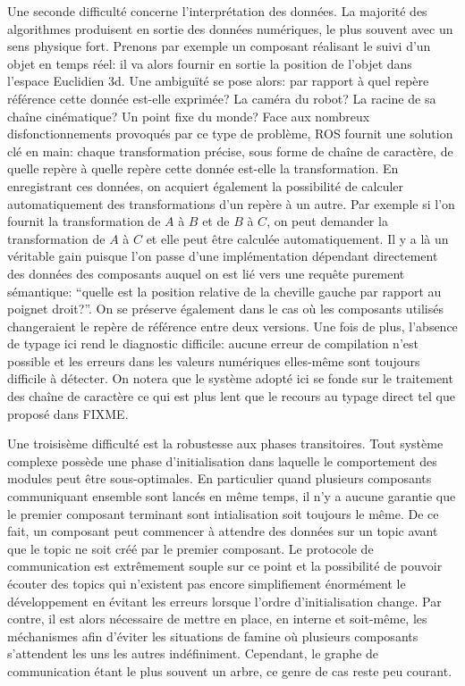 Une seconde difficulté concerne l'interprétation des données. La
majorité des algorithmes produisent en sortie des données numériques,
le plus souvent avec un sens physique fort. Prenons par exemple un
composant réalisant le suivi d'un objet en temps réel: il va alors
fournir en sortie la position de l'objet dans l'espace Euclidien
3d. Une ambiguïté se pose alors: par rapport à quel repère référence
cette donnée est-elle exprimée? La caméra du robot? La racine de sa
chaîne cinématique? Un point fixe du monde? Face aux nombreux
disfonctionnements provoqués par ce type de problème, ROS fournit une
solution clé en main: chaque transformation précise, sous forme de
chaîne de caractère, de quelle repère à quelle repère cette donnée
est-elle la transformation. En enregistrant ces données, on acquiert
également la possibilité de calculer automatiquement des
transformations d'un repère à un autre. Par exemple si l'on fournit la
transformation de $A$ à $B$ et de $B$ à $C$, on peut demander la
transformation de $A$ à $C$ et elle peut être calculée
automatiquement. Il y a là un véritable gain puisque l'on passe d'une
implémentation dépendant directement des données des composants auquel
on est lié vers une requête purement sémantique: ``quelle est la
position relative de la cheville gauche par rapport au poignet
droit?''. On se préserve également dans le cas où les composants
utilisés changeraient le repère de référence entre deux versions. Une
fois de plus, l'absence de typage ici rend le diagnostic difficile:
aucune erreur de compilation n'est possible et les erreurs dans les
valeurs numériques elles-même sont toujours difficile à détecter. On
notera que le système adopté ici se fonde sur le traitement des chaîne
de caractère ce qui est plus lent que le recours au typage direct tel
que proposé dans FIXME.


Une troisisème difficulté est la robustesse aux phases
transitoires. Tout système complexe possède une phase d'initialisation
dans laquelle le comportement des modules peut être sous-optimales. En
particulier quand plusieurs composants communiquant ensemble sont
lancés en même temps, il n'y a aucune garantie que le premier
composant terminant sont intialisation soit toujours le même. De ce
fait, un composant peut commencer à attendre des données sur un topic
avant que le topic ne soit créé par le premier composant. Le protocole
de communication est extrêmement souple sur ce point et la possibilité
de pouvoir écouter des topics qui n'existent pas encore simplifiement
énormément le développement en évitant les erreurs lorsque l'ordre
d'initialisation change. Par contre, il est alors nécessaire de mettre
en place, en interne et soit-même, les méchanismes afin d'éviter les
situations de famine où plusieurs composants s'attendent les uns les
autres indéfiniment. Cependant, le graphe de communication étant le
plus souvent un arbre, ce genre de cas reste peu courant.


